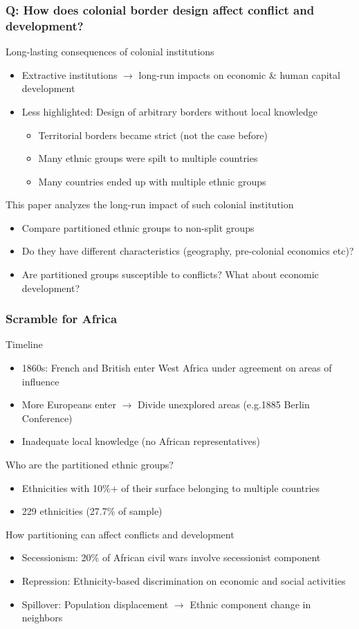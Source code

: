 \documentclass[aspectratio=169]{beamer}
\begin{document}
\begin{frame}
\frametitle{Q: How does colonial border design affect conflict and development?} 
Long-lasting consequences of colonial institutions
\begin{itemize}\setlength\itemsep{3pt}
\item Extractive institutions $\to$ long-run impacts on economic \& human capital development
\item Less highlighted: Design of arbitrary borders without local knowledge
\begin{itemize}\setlength\itemsep{3pt}
\item Territorial borders became strict (not the case before)  
\item Many ethnic groups were spilt to multiple countries
\item Many countries ended up with multiple ethnic groups
\end{itemize}
\end{itemize}\medskip
This paper analyzes the long-run impact of such colonial institution
\begin{itemize}\setlength\itemsep{3pt}
\item Compare partitioned ethnic groups to non-split groups
\item Do they have different characteristics (geography, pre-colonial economics etc)?
\item Are partitioned groups susceptible to conflicts? What about economic development?
\end{itemize}
\end{frame}

\begin{frame}
\frametitle{Scramble for Africa} 
Timeline
\begin{itemize}\setlength\itemsep{3pt}
\item 1860s: French and British enter West Africa under agreement on areas of influence
\item More Europeans enter $\to$ Divide unexplored areas (e.g.1885 Berlin Conference)
\item Inadequate local knowledge (no African representatives)
\end{itemize} \medskip
Who are the partitioned ethnic groups?
\begin{itemize}\setlength\itemsep{3pt}
\item Ethnicities with 10\%+ of their surface belonging to multiple countries
\item 229 ethnicities (27.7\% of sample)
\end{itemize} \medskip
How partitioning can affect conflicts and development
\begin{itemize}\setlength\itemsep{3pt}
\item Secessionism: 20\% of African civil wars involve secessionist component
\item Repression: Ethnicity-based discrimination on economic and social activities
\item Spillover: Population displacement $\to$ Ethnic component change in neighbors
\end{itemize} \medskip
\end{frame}
\end{document}
